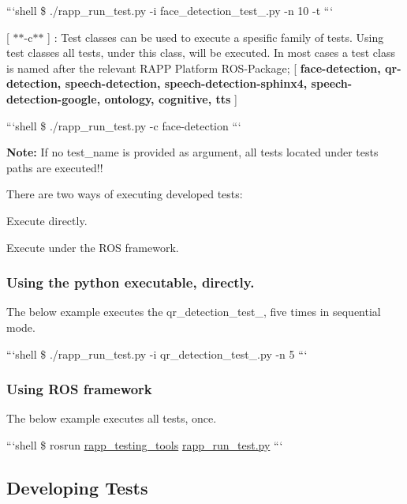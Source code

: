 ```shell \$ ./rapp\-\_\-run\-\_\-test.py -\/i face\-\_\-detection\-\_\-test\-\_.\-py -\/n 10 -\/t ```


\begin{DoxyItemize}
\item \mbox{[} $\ast$$\ast$-\/c$\ast$$\ast$ \mbox{]} \-: Test classes can be used to execute a spesific family of tests. Using test classes all tests, under this class, will be executed. In most cases a test class is named after the relevant R\-A\-P\-P Platform R\-O\-S-\/\-Package; \mbox{[} {\bfseries face-\/detection, qr-\/detection, speech-\/detection, speech-\/detection-\/sphinx4, speech-\/detection-\/google, ontology, cognitive, tts} \mbox{]}
\end{DoxyItemize}

```shell \$ ./rapp\-\_\-run\-\_\-test.py -\/c face-\/detection ```

{\bfseries Note\-:} If no test\-\_\-name is provided as argument, all tests located under tests paths are executed!!

There are two ways of executing developed tests\-:
\begin{DoxyItemize}
\item Execute directly.
\item Execute under the R\-O\-S framework.
\end{DoxyItemize}

\subsubsection*{Using the python executable, directly.}

The below example executes the qr\-\_\-detection\-\_\-test\-\_, five times in sequential mode.

```shell \$ ./rapp\-\_\-run\-\_\-test.py -\/i qr\-\_\-detection\-\_\-test\-\_.\-py -\/n 5 ```

\subsubsection*{Using R\-O\-S framework}

The below example executes all tests, once.

```shell \$ rosrun \hyperlink{namespacerapp__testing__tools}{rapp\-\_\-testing\-\_\-tools} \hyperlink{rapp__run__test_8py}{rapp\-\_\-run\-\_\-test.\-py} ```

\subsection*{Developing Tests}

